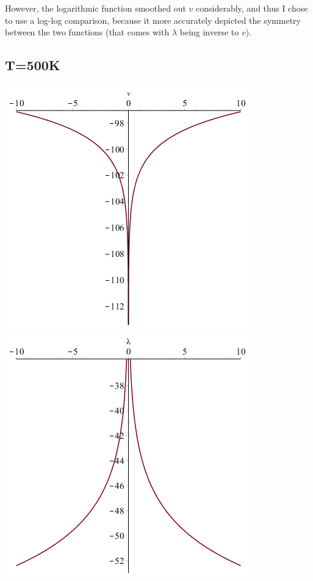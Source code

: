 \documentclass[11pt]{article} %
\begin{document}
\begin{enumerate}[i.)]
However, the logarithmic function smoothed out $v$ considerably, and thus I chose to use a log-log comparison, because it more accurately depicted the symmetry between the two functions (that comes with $\lambda$ being inverse to $v$).

\subsection*{T=500K}
\includegraphics[scale=.5]{plots/problem10plot500alog.png}
\includegraphics[scale=.5]{plots/problem10plot500blog.png} \\


\end{enumerate}
\end{document}
